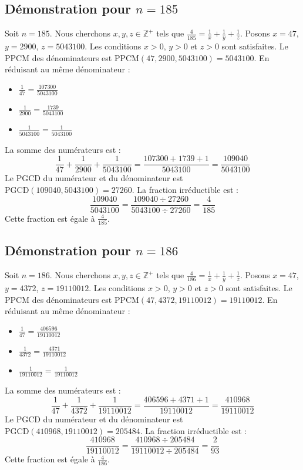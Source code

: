 \documentclass[11pt,a4paper]{article}
\begin{document}
\subsection{Démonstration pour $n = 185$}
Soit $n = 185$. Nous cherchons $x, y, z \in \mathbb{Z}^{+}$ tels que $\frac{4}{185} = \frac{1}{x} + \frac{1}{y} + \frac{1}{z}$.
Posons $x = 47$, $y = 2900$, $z = 5043100$.
Les conditions $x > 0$, $y > 0$ et $z > 0$ sont satisfaites.
Le PPCM des dénominateurs est $\text{PPCM}(47, 2900, 5043100) = 5043100$.
En réduisant au même dénominateur :
\begin{itemize}
    \item $\frac{1}{47} = \frac{107300}{5043100}$
    \item $\frac{1}{2900} = \frac{1739}{5043100}$
    \item $\frac{1}{5043100} = \frac{1}{5043100}$
\end{itemize}
La somme des numérateurs est :
$$ \frac{1}{47} + \frac{1}{2900} + \frac{1}{5043100} = \frac{107300 + 1739 + 1}{5043100} = \frac{109040}{5043100} $$
Le PGCD du numérateur et du dénominateur est $\text{PGCD}(109040, 5043100) = 27260$.
La fraction irréductible est :
$$ \frac{109040}{5043100} = \frac{109040 \div 27260}{5043100 \div 27260} = \frac{4}{185} $$
Cette fraction est égale à $\frac{4}{185}$.

\subsection{Démonstration pour $n = 186$}
Soit $n = 186$. Nous cherchons $x, y, z \in \mathbb{Z}^{+}$ tels que $\frac{4}{186} = \frac{1}{x} + \frac{1}{y} + \frac{1}{z}$.
Posons $x = 47$, $y = 4372$, $z = 19110012$.
Les conditions $x > 0$, $y > 0$ et $z > 0$ sont satisfaites.
Le PPCM des dénominateurs est $\text{PPCM}(47, 4372, 19110012) = 19110012$.
En réduisant au même dénominateur :
\begin{itemize}
    \item $\frac{1}{47} = \frac{406596}{19110012}$
    \item $\frac{1}{4372} = \frac{4371}{19110012}$
    \item $\frac{1}{19110012} = \frac{1}{19110012}$
\end{itemize}
La somme des numérateurs est :
$$ \frac{1}{47} + \frac{1}{4372} + \frac{1}{19110012} = \frac{406596 + 4371 + 1}{19110012} = \frac{410968}{19110012} $$
Le PGCD du numérateur et du dénominateur est $\text{PGCD}(410968, 19110012) = 205484$.
La fraction irréductible est :
$$ \frac{410968}{19110012} = \frac{410968 \div 205484}{19110012 \div 205484} = \frac{2}{93} $$
Cette fraction est égale à $\frac{4}{186}$.
\end{document}
